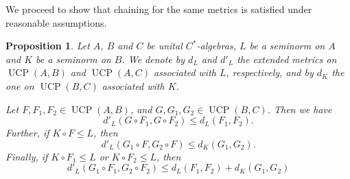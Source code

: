 \documentclass[11pt, a4paper, oneside, final, reqno]{amsart}
\newcommand{\UCP}{\operatorname{UCP}}
\theoremstyle{definition}
\theoremstyle{plain}
\newtheorem{proposition}[definition]{Proposition}
\theoremstyle{remark}
\numberwithin{equation}{section}
\begin{document}
We proceed to show that chaining for the same metrics is satisfied under reasonable assumptions.

\begin{proposition}\label{chaining-ucp}
    Let $A$, $B$ and $C$ be unital $C^*$-algebras, $L$ be a seminorm on $A$ and $K$ be a seminorm on $B$. We denote by $d_L$ and $d'_L$ the extended metrics on $\UCP(A, B)$ and $\UCP(A, C)$ associated with $L$, respectively, and by $d_K$ the one on $\UCP(B, C)$ associated with $K$.

    Let $F, F_1, F_2 \in \UCP(A,B)$, and $G, G_1, G_2 \in \UCP(B,C)$. Then we have
   \begin{equation}\label{chaining-ucp1}
        d'_{L}(G \circ F_1, G \circ F_2) \leq d_L(F_1,F_2).
   \end{equation}
    Further, if $K\circ F \leq L$, then
   \begin{equation}\label{chaining-ucp2}
        d'_{L}(G_1 \circ F, G_2 \circ F) \leq d_K(G_1,G_2).
   \end{equation}
   Finally, if $K\circ F_1 \leq L$ or $K\circ F_2 \leq L$, then
    \begin{equation}\label{chaining-ucp3}
        d'_{L}(G_1 \circ F_1, G_2 \circ F_2) \leq d_L(F_1,F_2) + d_K(G_1,G_2)
    \end{equation}
\end{proposition}
\end{document}
